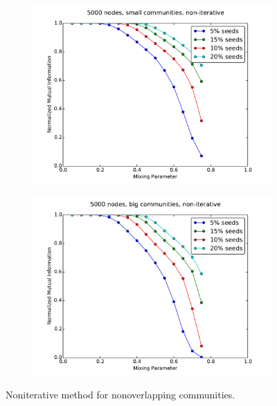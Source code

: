 \begin{figure}
\begin{subfigure}{0.5\textwidth}
    \includegraphics[width=\linewidth]{allplots/nonoverlap_noniter_c.pdf}
    \end{subfigure}%
    \begin{subfigure}{0.5\textwidth}
    \includegraphics[width=\linewidth]{allplots/nonoverlap_noniter_d.pdf}
    \end{subfigure}
    \caption{Noniterative method for nonoverlapping communities.}
\end{figure}

